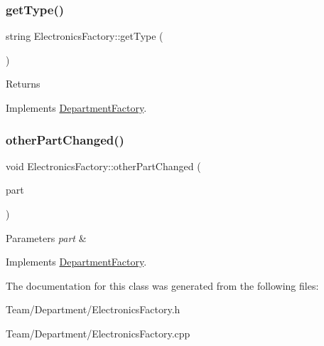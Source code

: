 \subsubsection{\texorpdfstring{get\+Type()}{getType()}}
{\footnotesize\ttfamily string Electronics\+Factory\+::get\+Type (\begin{DoxyParamCaption}{ }\end{DoxyParamCaption})\hspace{0.3cm}{\ttfamily [virtual]}}

\begin{DoxyReturn}{Returns}

\end{DoxyReturn}


Implements \hyperlink{classDepartmentFactory_a5aac775b89c4c390ad885e1de8947b0d}{Department\+Factory}.

\mbox{\label{classElectronicsFactory_ae21ff30f4890eab2474fac71d2615941}} 
\subsubsection{\texorpdfstring{other\+Part\+Changed()}{otherPartChanged()}}
{\footnotesize\ttfamily void Electronics\+Factory\+::other\+Part\+Changed (\begin{DoxyParamCaption}\item[{\hyperlink{classDepartmentOutput}{Department\+Output} $\ast$}]{part }\end{DoxyParamCaption})\hspace{0.3cm}{\ttfamily [virtual]}}


\begin{DoxyParams}{Parameters}
{\em part} & \\
\hline
\end{DoxyParams}


Implements \hyperlink{classDepartmentFactory_a41e5c96ee84f8237cb08d31cd782efae}{Department\+Factory}.



The documentation for this class was generated from the following files\+:\begin{DoxyCompactItemize}
\item 
Team/\+Department/Electronics\+Factory.\+h\item 
Team/\+Department/Electronics\+Factory.\+cpp\end{DoxyCompactItemize}

